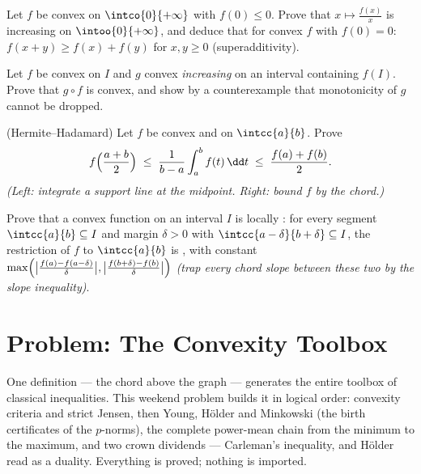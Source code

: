 \begin{exercise}[$\star\star\star$]\label{exo:b2:realfun:9}
Let $f$ be convex on $\intco{0}{+\infty}$ with $f(0) \leq 0$. Prove
that $x \mapsto \frac{f(x)}{x}$ is increasing on
$\intoo{0}{+\infty}$, and deduce that for convex $f$ with $f(0) =
0$: $f(x + y) \geq f(x) + f(y)$ for $x, y \geq 0$
(superadditivity).
\end{exercise}

\begin{exercise}[$\star$]\label{exo:b2:realfun:10}
Let $f$ be convex on $I$ and $g$ convex \emph{increasing} on an
interval containing $f(I)$. Prove that $g \circ f$ is convex, and
show by a counterexample that monotonicity of $g$ cannot be
dropped.
\end{exercise}

\begin{exercise}[$\star\star$]\label{exo:b2:realfun:11}
(Hermite--Hadamard) Let $f$ be convex and  on
$\intcc{a}{b}$. Prove
\[
f\Bigl(\frac{a+b}{2}\Bigr) \;\leq\; \frac{1}{b -
a}\int_a^b f(t)\,\dd t \;\leq\; \frac{f(a) + f(b)}{2} .
\]
\emph{(Left: integrate a support line at the midpoint. Right:
bound $f$ by the chord.)}
\end{exercise}

\begin{exercise}[$\star\star\star$]\label{exo:b2:realfun:12}
Prove that a convex function on an \emph{} interval $I$ is
locally : for every segment $\intcc{a}{b} \subseteq I$
and margin $\delta > 0$ with $\intcc{a - \delta}{b + \delta}
\subseteq I$, the restriction of $f$ to $\intcc{a}{b}$ is
, with constant
$\max\Bigl(\bigl|\frac{f(a) - f(a - \delta)}{\delta}\bigr|,
\bigl|\frac{f(b + \delta) - f(b)}{\delta}\bigr|\Bigr)$
\emph{(trap every chord slope between these two by the slope
inequality)}.
\end{exercise}

\section{Problem: The Convexity Toolbox}

One definition --- the chord above the graph --- generates the
entire toolbox of classical inequalities. This weekend problem
builds it in logical order: convexity criteria and strict Jensen,
then Young, H\"older and Minkowski (the birth certificates of the
$p$-norms), the complete power-mean chain from the minimum to the
maximum, and two crown dividends --- Carleman's inequality, and
H\"older read as a duality. Everything is proved; nothing is
imported.

